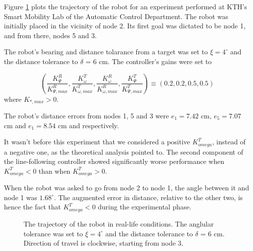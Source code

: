 Figure \ref{fig:22_map_7} plots the trajectory of the robot for an experiment
performed at KTH's Smart Mobility Lab of the Automatic Control Department. The
robot was initially placed in the vicinity of node 2. Its first goal was
dictated to be node 1, and from there, nodes 5 and 3.

The robot's bearing and distance tolarance from a target was set to
$\xi = 4^{\circ}$ and the distance tolerance to $\delta$ = 6 cm. The controller's
gains were set to

$$(\dfrac{K_{\Psi}^R}{K_{\Psi,max}^R}, \dfrac{K_{\omega}^T}{K_{\omega, max}^T}, \dfrac{K_{\omega}^R}{K_{\omega,max}^R}, \dfrac{K_{\Psi}^T}{K_{\Psi,max}^T})
\equiv (0.2, 0.2, 0.5, 0.5)$$
where $K_{*,max} > 0$.

The robot's distance errors from nodes 1, 5 and 3 were $e_1 = 7.42$ cm,
$e_5 = 7.07$ cm and $e_1 = 8.54$ cm and respectively.

It wasn't before this experiment that we considered a
positive $K_{omega}^T$, instead of a negative one, as the theoretical analysis
pointed to. The second component of the line-following controller showed
significantly worse performance when $K_{omega}^T < 0$ than when $K_{omega}^T > 0$.

When the robot was asked to go from node 2 to node 1, the angle between it and
node 1 was $1.68^{\circ}$. The augmented error in distance, relative to the
other two, is hence the fact that $K_{omega}^T < 0$ during the experimental
phase.

\begin{figure}[H]\centering
  \scalebox{1}{}
  \caption{The trajectory of the robot in real-life conditions. The anglular
    tolerance was set to $\xi = 4^{\circ}$ and the distance tolerance to
    $\delta$ = 6 cm. Direction of travel is clockwise, starting from node 3.}
  \label{fig:22_map_7}
\end{figure}
